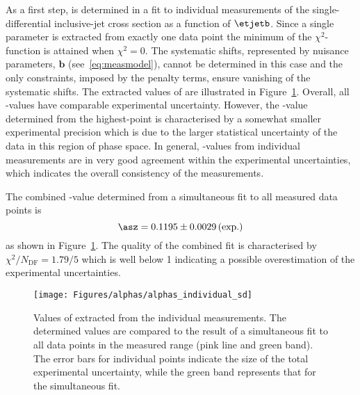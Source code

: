As a first step, \asz is determined in a fit to individual measurements of the single-differential inclusive-jet cross section as a function of $\etjetb$. Since a single parameter is extracted from exactly one data point the minimum of the $\chi^2$-function is attained when $\chi^2=0$. The systematic shifts, represented by nuisance parameters, $\mathbf{b}$ (see~\eqref{eq:measmodel}), cannot be determined in this case and the only constraints, imposed by the penalty terms, ensure vanishing of the systematic shifts. The extracted values of \asz are illustrated in Figure~\ref{fig:alphassinglediffindividual}. Overall, all \as-values have comparable experimental uncertainty. However, the \as-value determined from the highest-\etjetb point is characterised by a somewhat smaller experimental precision which is due to the larger statistical uncertainty of the data in this region of phase space. In general, \as-values from individual measurements are in very good agreement within the experimental uncertainties, which indicates the overall consistency of the measurements.

The combined \asz-value determined from a simultaneous fit to all measured data points is
\begin{equation}
 \asz = 0.1195 \pm 0.0029 \left( \text{exp.} \right) %
 \label{eq:assingledifval}
\end{equation}
as shown in Figure~\ref{fig:alphassinglediffindividual}. The quality of the combined fit is characterised by $\chi^2/N_\text{DF}=1.79/5$ which is well below 1 indicating a possible overestimation of the experimental uncertainties.

\begin{figure}[t]
 \centering
 \texttt{[image: Figures/alphas/alphas\_individual\_sd]}
 \caption{Values of \asz extracted from the individual \dsdetjetb measurements. The determined values are compared to the result of a simultaneous fit to all data points in the measured \etjetb range (pink line and green band). The error bars for individual points indicate the size of the total experimental uncertainty, while the green band represents that for the simultaneous fit.}
 \label{fig:alphassinglediffindividual}
\end{figure}

